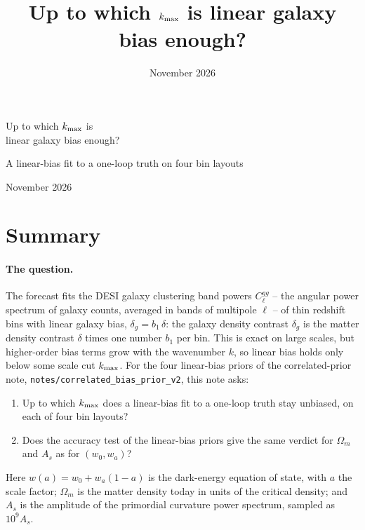 \documentclass[11pt]{article}
\title{Up to which $k_{\rm max}$ is linear galaxy bias enough?}
\date{November 2026}
\author{}
\newcommand{\kmax}{k_{\rm max}}
\begin{document}
\begin{center}
  {\LARGE Up to which $k_{\rm max}$ is\\[0.3em] linear galaxy bias enough?\par}
  \vspace{0.6em}
  {\large A linear-bias fit to a one-loop truth on four bin layouts\par}
  \vspace{1em}
  {\large November 2026\par}
\end{center}
\vspace{1em}

\section{Summary}
\label{sec:summary}

\paragraph{The question.}
The forecast fits the DESI galaxy clustering band powers
$C_\ell^{gg}$ -- the angular power spectrum of galaxy counts,
averaged in bands of multipole $\ell$ -- of thin redshift bins with
linear galaxy bias,
$\delta_g = b_1\,\delta$: the galaxy density contrast $\delta_g$ is
the matter density contrast $\delta$ times one number $b_1$ per bin.
This is exact on large scales, but higher-order bias terms grow with
the wavenumber $k$, so linear bias holds only below some scale cut
$\kmax$.  For the four linear-bias priors of the correlated-prior
note, \texttt{notes/correlated\_bias\_prior\_v2}, this note asks:
\begin{enumerate}
  \item Up to which $\kmax$ does a linear-bias fit to a one-loop truth
    stay unbiased, on each of four bin layouts?
  \item Does the accuracy test of the linear-bias priors give the same
    verdict for $\Omega_m$ and $A_s$ as for $(w_0, w_a)$?
\end{enumerate}
Here $w(a) = w_0 + w_a(1 - a)$ is the dark-energy equation of state,
with $a$ the scale factor; $\Omega_m$ is the matter density today in
units of the critical density; and $A_s$ is the amplitude of the
primordial curvature power spectrum, sampled as $10^9 A_s$.
\end{document}
